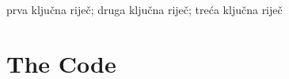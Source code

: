 \documentclass[masterthesis]{fer}
\begin{document}
\begin{kljucnerijeci}
  prva ključna riječ; druga ključna riječ; treća ključna riječ
\end{kljucnerijeci}




\backmatter

\chapter{The Code}

\Blindtext
\end{document}
